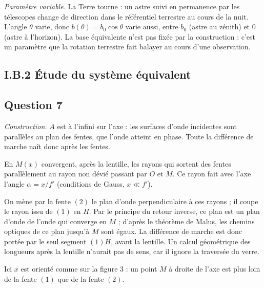 \documentclass[11pt,a4paper]{article}
\newcommand{\equationajustee}[1]{%
  \sbox{\boiteequation}{$\displaystyle #1$}%
  \ifdim\wd\boiteequation>\linewidth
    \[\resizebox{\linewidth}{!}{\usebox{\boiteequation}}\]%
  \else
    \[#1\]%
  \fi}
\begin{document}
\emph{Paramètre variable.} La Terre tourne : un astre suivi en permanence par les télescopes change de direction dans le référentiel terrestre au cours de la nuit. L'angle \(\theta\) varie, donc \(b(\theta)=b_0\cos\theta\) varie aussi, entre \(b_0\) (astre au zénith) et \(0\) (astre à l'horizon). La base équivalente n'est pas fixée par la construction : c'est un paramètre que la rotation terrestre fait balayer au cours d'une observation.

\hypertarget{i.b.2-uxe9tude-du-systuxe8me-uxe9quivalent}{%
\subsection{I.B.2 Étude du système équivalent}\label{i.b.2-uxe9tude-du-systuxe8me-uxe9quivalent}}

\hypertarget{question-7}{%
\subsection{Question 7}\label{question-7}}

\emph{Construction.} \(A\) est à l'infini sur l'axe : les surfaces d'onde incidentes sont parallèles au plan des fentes, que l'onde atteint en phase. Toute la différence de marche naît donc après les fentes.

En \(M(x)\) convergent, après la lentille, les rayons qui sortent des fentes parallèlement au rayon non dévié passant par \(O\) et \(M\). Ce rayon fait avec l'axe l'angle \(\alpha=x/f'\) (conditions de Gauss, \(x\ll f'\)).

On mène par la fente \((2)\) le plan d'onde perpendiculaire à ces rayons ; il coupe le rayon issu de \((1)\) en \(H\). Par le principe du retour inverse, ce plan est un plan d'onde de l'onde qui converge en \(M\) ; d'après le théorème de Malus, les chemins optiques de ce plan jusqu'à \(M\) sont égaux. La différence de marche est donc portée par le seul segment \((1)H\), avant la lentille. Un calcul géométrique des longueurs après la lentille n'aurait pas de sens, car il ignore la traversée du verre.

\equationajustee{\begin{aligned}
\delta_A(x)&=(1)H=b(\theta)\,\alpha=\frac{b(\theta)\,x}{f'}\\
\boxed{p_A(x)=\frac{\delta_A}{\lambda_0}=\frac{b(\theta)\,x}{\lambda_0f'}}&
\end{aligned}}

Ici \(x\) est orienté comme sur la figure 3 : un point \(M\) à droite de l'axe est plus loin de la fente \((1)\) que de la fente \((2)\).
\end{document}
